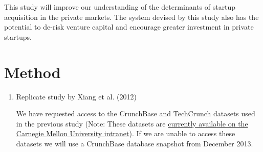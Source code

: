 \documentclass[12pt, a4paper]{article}
\begin{document}
This study will improve our understanding of the determinants of startup acquisition in the private markets. The system devised by this study also has the potential to de-risk venture capital and encourage greater investment in private startups.

\section*{Method}

\begin{enumerate}
\item Replicate study by Xiang et al. (2012) \cite{xiang2012}

We have requested access to the CrunchBase and TechCrunch datasets used in the previous study (Note: These datasets are \href{http://www.cs.cmu.edu/~guangx/crunchbase.html}{currently available on the Carnegie Mellon University intranet}). If we are unable to  access these datasets we will use a CrunchBase database snapshot from December 2013.


\end{enumerate}
\end{document}
